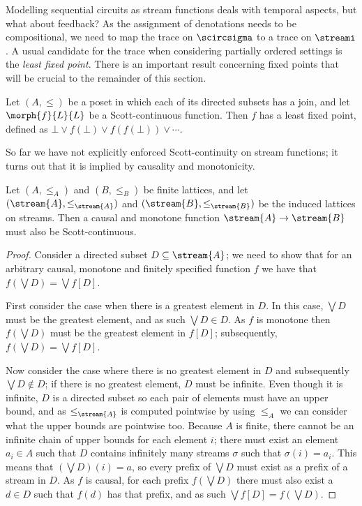 \documentclass{lmcs}
\begin{document}
Modelling sequential circuits as stream functions deals with temporal
aspects, but what about feedback?
As the assignment of denotations needs to be compositional, we need
to map the trace on \(\scircsigma\) to a trace on \(\streami\).
A usual candidate for the trace when considering partially ordered settings is
the \emph{least fixed point}.
There is an important result concerning fixed points that will be crucial to
the remainder of this section.

\begin{thm}
    Let \((A, \leq)\) be a poset in which each of its directed subsets has a
    join, and let \(\morph{f}{L}{L}\) be a Scott-continuous function.
    Then \(f\) has a least fixed point, defined as \(
    \bot \vee f(\bot) \vee f(f(\bot)) \vee \cdots
    \).
\end{thm}

So far we have not explicitly enforced Scott-continuity on stream functions; it
turns out that it is implied by causality and monotonicity.

\begin{prop}\label{prop:monotone-causal-scott}
    Let \((A, \leq_A)\) and \((B, \leq_B)\) be finite lattices, and let
    \((\stream{A}, \leq_{\stream{A}})\) and \((\stream{B}, \leq_{\stream{B}})\)
    be the induced lattices on streams.
    Then a causal and monotone function \(\stream{A} \to \stream{B}\) must also
    be Scott-continuous.
\end{prop}
\begin{proof}
    Consider a directed subset \(D \subseteq \stream{A}\); we need to show that
    for an arbitrary causal, monotone and finitely specified function \(f\) we
    have that \(f\left(\bigvee D\right) = \bigvee f[D]\).

    First consider the case when there is a greatest element in \(D\).
    In this case, \(\bigvee D\) must be the greatest element, and as such
    \(\bigvee D \in D\).
    As \(f\) is monotone then \(f(\bigvee D)\) must be the greatest element in
    \(f[D]\); subsequently, \(f\left(\bigvee D\right) = \bigvee f[D]\).

    Now consider the case where there is no greatest element in \(D\) and
    subsequently \(\bigvee D \not\in D\); if there is no greatest element,
    \(D\) must be infinite.
    Even though it is infinite, \(D\) is a directed subset so each pair of
    elements must have an upper bound, and as \(\leq_{\stream{A}}\) is computed
    pointwise by using \(\leq_A\) we can consider what the upper bounds are
    pointwise too.
    Because \(A\) is finite, there cannot be an infinite chain of upper bounds
    for each element \(i\); there must exist an element \(a_i \in A\) such that
    \(D\) contains infinitely many streams \(\sigma\) such that
    \(\sigma(i) = a_i\).
    This means that \(\left(\bigvee D\right)(i) = a\), so every prefix of
    \(\bigvee D\) must exist as a prefix of a stream in \(D\).
    As \(f\) is causal, for each prefix
    \(f\left(\bigvee D\right)\) there must also exist a \(d \in D\) such that
    \(f(d)\) has that prefix, and as such
    \(\bigvee f[D] = f\left(\bigvee D\right)\).
\end{proof}
\end{document}

